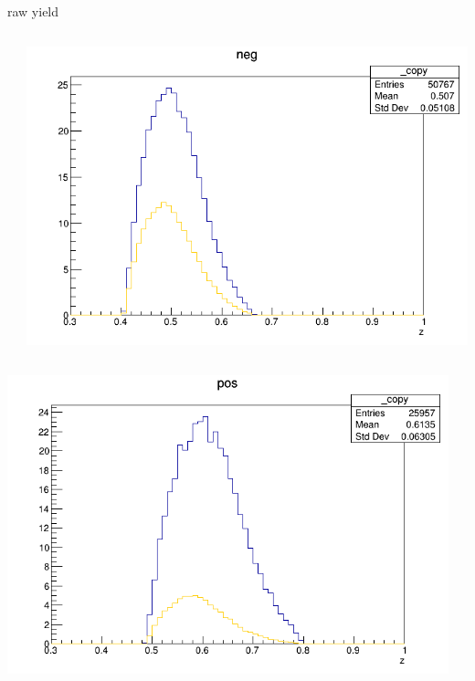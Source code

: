 \begin{frame}{raw yield}
\begin{columns}
\begin{column}[T]{0.25\textwidth}
\end{column}
\begin{column}[T]{0.25\textwidth}
\includegraphics[width = \textwidth]{results/yield/statistics/yield_x_Q2_z_0.45_3.898_0.50_neg.png}
\end{column}
\end{columns}
\begin{columns}
\begin{column}[T]{0.25\textwidth}
\includegraphics[width = \textwidth]{results/yield/statistics/yield_x_Q2_z_0.45_3.898_0.60_pos.png}
\end{column}
\begin{column}[T]{0.25\textwidth}

\end{column}
\end{columns}
\end{frame}
